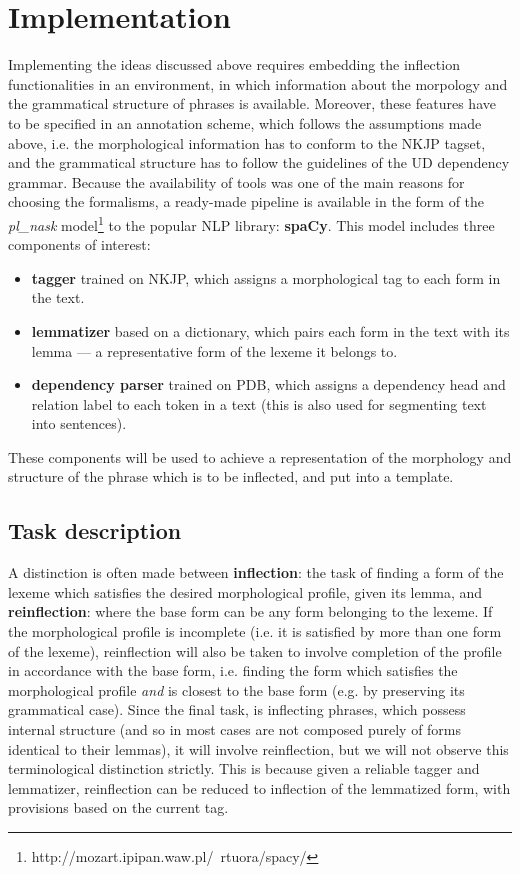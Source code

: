 \documentclass[12pt]{article}
\begin{document}
\section{Implementation}
Implementing the ideas discussed above requires embedding the inflection functionalities in an environment, in which information about the morpology and the grammatical structure of phrases is available. Moreover, these features have to be specified in an annotation scheme, which follows the assumptions made above, i.e. the morphological information has to conform to the NKJP tagset, and the grammatical structure has to follow the guidelines of the UD dependency grammar. Because the availability of tools was one of the main reasons for choosing the formalisms, a ready-made pipeline is available in the form of the \textit{pl\_nask} model\footnote{http://mozart.ipipan.waw.pl/~rtuora/spacy/} to the popular NLP library: \textbf{spaCy}. This model includes three components of interest: \begin{itemize}
	\item \textbf{tagger} trained on NKJP, which assigns a morphological tag to each form in the text.
	\item \textbf{lemmatizer} based on a dictionary, which pairs each form in the text with its lemma --- a representative form of the lexeme it belongs to.
	\item \textbf{dependency parser} trained on PDB, which assigns a dependency head and relation label to each token in a text (this is also used for segmenting text into sentences).
\end{itemize}
\noindent These components will be used to achieve a representation of the morphology and structure of the phrase which is to be inflected, and put into a template.

\subsection{Task description}
A distinction is often made between \textbf{inflection}: the task of finding a form of the lexeme which satisfies the desired morphological profile, given its lemma, and \textbf{reinflection}: where the base form can be any form belonging to the lexeme. If the morphological profile is incomplete (i.e. it is satisfied by more than one form of the lexeme), reinflection will also be taken to involve completion of the profile in accordance with the base form, i.e. finding the form which satisfies the morphological profile \textit{and} is closest to the base form (e.g. by preserving its grammatical case). Since the final task, is inflecting phrases, which possess internal structure (and so in most cases are not composed purely of forms identical to their lemmas), it will involve reinflection, but we will not observe this terminological distinction strictly. This is because given a reliable tagger and lemmatizer, reinflection can be reduced to inflection of the lemmatized form, with provisions based on the current tag.
\end{document}
